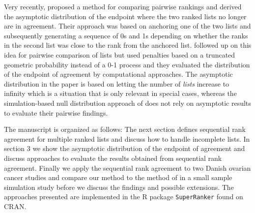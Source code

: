 \documentclass[oupdraft]{bio}
\newcommand{\added}[1]{{\color{added}{}#1}}
\begin{document}




Very recently, \citet{hall:schi:2012} proposed a method for comparing
pairwise rankings and derived the asymptotic distribution of the
endpoint where the two ranked lists no longer are in agreement. Their
approach was based on anchoring one of the two lists and subsequently
generating a sequence of 0s and 1s depending on whether the ranks in
the second list was close to the rank from the anchored
list. \citet{samp:verd:2013} followed up on this idea for pairwise
comparison of lists but used penalties based on a truncated geometric
probability instead of a 0-1 process and they evaluated the
distribution of the endpoint of agreement by computational approaches.
The asymptotic distribution in the \citet{hall:schi:2012} paper is
based on letting the number of \emph{lists} increase to infinity which
is a situation that is only relevant in special cases, whereas the
\added{simulation-based null distribution approach of
  \citet{samp:verd:2013} does not rely on asymptotic results to
  evaluate their pairwise findings.}



The manuscript is organized as follows: The next section defines
sequential rank agreement for multiple ranked lists and discuss how to
handle incomplete lists. In section 3 we show the asymptotic
distribution of the endpoint of agreement and discuss approaches to
evaluate the results obtained from sequential rank agreement.
Finally we apply the sequential rank agreement to two Danish ovarian
cancer studies and compare our method to the method of
\citet{hall:schi:2012} in a small sample simulation study before we
discuss the findings and possible extensions. The approaches
presented are implemented in the R package \texttt{SuperRanker}  found on CRAN.
\end{document}
